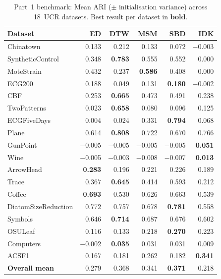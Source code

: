 \begin{table}[htbp]
\centering
\caption{Part~1 benchmark: Mean ARI ($\pm$ initialisation variance) across 18~UCR datasets. Best result per dataset in \textbf{bold}.}\label{tab:part1-ari}
\small
\begin{tabular}{l r r r r r}
\toprule
Dataset & ED & DTW & MSM & SBD & IDK \\
\midrule
Chinatown           &  0.133 &  0.212 &  0.133 &  0.072 & $-$0.003 \\
SyntheticControl    &  0.348 &  \textbf{0.783} &  0.555 &  0.552 &  0.000 \\
MoteStrain          &  0.432 &  0.237 &  \textbf{0.586} &  0.408 &  0.000 \\
ECG200              &  0.188 &  0.049 &  0.131 &  \textbf{0.180} & $-$0.002 \\
CBF                 &  0.253 &  \textbf{0.665} &  0.473 &  0.491 &  0.238 \\
TwoPatterns         &  0.023 &  \textbf{0.658} &  0.080 &  0.096 &  0.125 \\
ECGFiveDays         &  0.004 &  0.024 &  0.331 &  \textbf{0.794} &  0.068 \\
Plane               &  0.614 &  \textbf{0.808} &  0.722 &  0.670 &  0.766 \\
GunPoint            & $-$0.005 & $-$0.005 & $-$0.005 & $-$0.005 &  \textbf{0.051} \\
Wine                & $-$0.005 & $-$0.003 & $-$0.008 & $-$0.007 &  \textbf{0.013} \\
ArrowHead           &  \textbf{0.283} &  0.196 &  0.221 &  0.226 &  0.189 \\
Trace               &  0.367 &  \textbf{0.645} &  0.414 &  0.593 &  0.212 \\
Coffee              &  \textbf{0.693} &  0.530 &  0.626 &  0.663 &  0.539 \\
DiatomSizeReduction &  0.772 &  0.757 &  0.678 &  \textbf{0.781} &  0.558 \\
Symbols             &  0.646 &  \textbf{0.714} &  0.687 &  0.676 &  0.602 \\
OSULeaf             &  0.116 &  0.133 &  0.218 &  \textbf{0.270} &  0.223 \\
Computers           & $-$0.002 &  \textbf{0.035} &  0.031 &  0.031 &  0.009 \\
ACSF1               &  0.167 &  0.181 &  0.262 &  0.182 &  \textbf{0.341} \\
\midrule
\textbf{Overall mean} & 0.279 & 0.368 & 0.341 & \textbf{0.371} & 0.218 \\
\bottomrule
\end{tabular}
\end{table}


